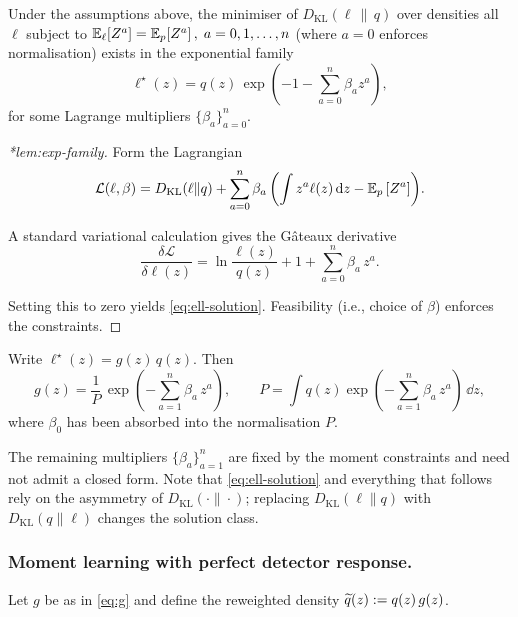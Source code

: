 \begin{theorem}\label{lem:exp-family}
Under the assumptions above, the minimiser of $D_{\mathrm{KL}}(\ell\,\|\,q)$ over densities all $\ell$ subject to
\(
\operatorname{\mathbb{E}}_{\ell}[Z^a]=\operatorname{\mathbb{E}}_{p}[Z^a]\,,\; a=0,1,\dots,n
\)
(where $a=0$ enforces normalisation) exists in the exponential family
\begin{equation}\label{eq:ell-solution}
    \ell^\star(z) = q(z)\,\exp(-1-\sum_{a=0}^n \beta_a z^a),
\end{equation}
for some Lagrange multipliers $\{\beta_a\}_{a=0}^n$.
\end{theorem}

\begin{proof}[*lem:exp-family]
Form the Lagrangian
\begin{equation}\label{eq:L-ell}
    \mathcal{L}(\ell,\beta) = D_{\mathrm{KL}}(\ell\|q)  + \sum_{a=0}^n \beta_a\,\qty(\int z^a\ell(z)\,\dd z - \operatorname{\mathbb{E}}_{p}\qty[Z^a]).
\end{equation}

A standard variational calculation gives the Gâteaux derivative
\[
\frac{\delta\mathcal{L}}{\delta \ell(z)} = \ln\frac{\ell(z)}{q(z)}+1+\sum_{a=0}^n \beta_a\, z^a.
\]

Setting this to zero yields \cref{eq:ell-solution}. Feasibility (i.e., choice of $\beta$) enforces the constraints.
\end{proof}

Write $\ell^\star(z)=g(z)\,q(z)$. Then
\begin{equation}
\label{eq:g}
    g(z) = \frac{1}{P}\,\exp(-\sum_{a=1}^n \beta_a\, z^a),\qquad
    P = \int q(z)\exp(-\sum_{a=1}^n \beta_a\,z^a)\,\dd z,
\end{equation}
where $\beta_0$ has been absorbed into the normalisation $P$.

The remaining multipliers $\{\beta_a\}_{a=1}^n$ are fixed by the moment constraints and need not admit a closed form.
%
Note that \cref{eq:ell-solution} and everything that follows rely on the asymmetry of $D_{\mathrm{KL}}(\cdot\|\cdot)$; replacing $D_{\mathrm{KL}}(\ell\|q)$ with $D_{\mathrm{KL}}(q\|\ell)$ changes the solution class.

\subsubsection{Moment learning with perfect detector response.}
Let $g$ be as in \cref{eq:g} and define the reweighted density $\widetilde{q}(z) := q(z)\,g(z)$.

